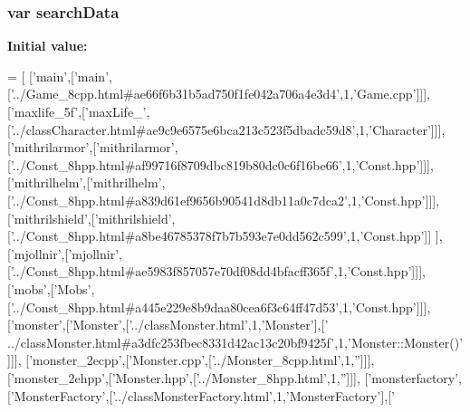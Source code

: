 \subsubsection[{search\-Data}]{\setlength{\rightskip}{0pt plus 5cm}var search\-Data}\label{all__c_8js_ad01a7523f103d6242ef9b0451861231e}
{\bfseries Initial value\-:}
\begin{DoxyCode}
=
[
  [\textcolor{stringliteral}{'main'},[\textcolor{stringliteral}{'main'},[\textcolor{stringliteral}{'../Game\_8cpp.html#ae66f6b31b5ad750f1fe042a706a4e3d4'},1,\textcolor{stringliteral}{'Game.cpp'}]]],
  [\textcolor{stringliteral}{'maxlife\_5f'},[\textcolor{stringliteral}{'maxLife\_'},[\textcolor{stringliteral}{'../classCharacter.html#ae9c9e6575e6bca213c523f5dbadc59d8'},1,\textcolor{stringliteral}{'Character'}]]],
  [\textcolor{stringliteral}{'mithrilarmor'},[\textcolor{stringliteral}{'mithrilarmor'},[\textcolor{stringliteral}{'../Const\_8hpp.html#af99716f8709dbc819b80dc0c6f16be66'},1,\textcolor{stringliteral}{'Const.hpp'}]]],
  [\textcolor{stringliteral}{'mithrilhelm'},[\textcolor{stringliteral}{'mithrilhelm'},[\textcolor{stringliteral}{'../Const\_8hpp.html#a839d61ef9656b90541d8db11a0c7dca2'},1,\textcolor{stringliteral}{'Const.hpp'}]]],
  [\textcolor{stringliteral}{'mithrilshield'},[\textcolor{stringliteral}{'mithrilshield'},[\textcolor{stringliteral}{'../Const\_8hpp.html#a8be46785378f7b7b593e7e0dd562c599'},1,\textcolor{stringliteral}{'Const.hpp'}]]
      ],
  [\textcolor{stringliteral}{'mjollnir'},[\textcolor{stringliteral}{'mjollnir'},[\textcolor{stringliteral}{'../Const\_8hpp.html#ae5983f857057e70df08dd4bfacff365f'},1,\textcolor{stringliteral}{'Const.hpp'}]]],
  [\textcolor{stringliteral}{'mobs'},[\textcolor{stringliteral}{'Mobs'},[\textcolor{stringliteral}{'../Const\_8hpp.html#a445e229e8b9daa80cea6f3c64ff47d53'},1,\textcolor{stringliteral}{'Const.hpp'}]]],
  [\textcolor{stringliteral}{'monster'},[\textcolor{stringliteral}{'Monster'},[\textcolor{stringliteral}{'../classMonster.html'},1,\textcolor{stringliteral}{'Monster'}],[\textcolor{stringliteral}{'
      ../classMonster.html#a3dfc253fbec8331d42ac13c20bf9425f'},1,\textcolor{stringliteral}{'Monster::Monster()'}]]],
  [\textcolor{stringliteral}{'monster\_2ecpp'},[\textcolor{stringliteral}{'Monster.cpp'},[\textcolor{stringliteral}{'../Monster\_8cpp.html'},1,\textcolor{stringliteral}{''}]]],
  [\textcolor{stringliteral}{'monster\_2ehpp'},[\textcolor{stringliteral}{'Monster.hpp'},[\textcolor{stringliteral}{'../Monster\_8hpp.html'},1,\textcolor{stringliteral}{''}]]],
  [\textcolor{stringliteral}{'monsterfactory'},[\textcolor{stringliteral}{'MonsterFactory'},[\textcolor{stringliteral}{'../classMonsterFactory.html'},1,\textcolor{stringliteral}{'MonsterFactory'}],[\textcolor{stringliteral}{'
}
\end{DoxyCode}
